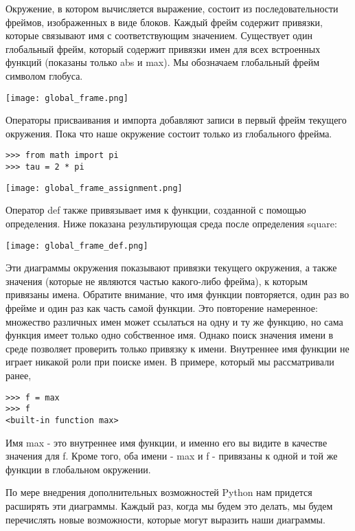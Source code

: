 Окружение, в котором вычисляется выражение, состоит из последовательности фреймов, изображенных в виде блоков. Каждый фрейм содержит привязки, которые связывают имя с соответствующим значением. Существует один глобальный фрейм, который содержит привязки имен для всех встроенных функций (показаны только abs и max). Мы обозначаем глобальный фрейм символом глобуса.
\begin{center}
  \texttt{[image: global\_frame.png]}
\end{center}

Операторы присваивания и импорта добавляют записи в первый фрейм текущего окружения. Пока что наше окружение состоит только из глобального фрейма.
\begin{verbatim}
>>> from math import pi
>>> tau = 2 * pi
\end{verbatim}

\begin{center}
  \texttt{[image: global\_frame\_assignment.png]}
\end{center}

Оператор def также привязывает имя к функции, созданной с помощью определения. Ниже показана результирующая среда после определения square:
\begin{center}
  \texttt{[image: global\_frame\_def.png]}
\end{center}

Эти диаграммы окружения показывают привязки текущего окружения, а также значения (которые не являются частью какого-либо фрейма), к которым привязаны имена. Обратите внимание, что имя функции повторяется, один раз во фрейме и один раз как часть самой функции. Это повторение намеренное: множество различных имен может ссылаться на одну и ту же функцию, но сама функция имеет только одно собственное имя. Однако поиск значения имени в среде позволяет проверить только привязку к имени. Внутреннее имя функции не играет никакой роли при поиске имен. В примере, который мы рассматривали ранее,
\begin{verbatim}
>>> f = max
>>> f
<built-in function max>
\end{verbatim}

Имя max - это внутреннее имя функции, и именно его вы видите в качестве значения для f. Кроме того, оба имени - max и f - привязаны к одной и той же функции в глобальном окружении.

По мере внедрения дополнительных возможностей Python нам придется расширять эти диаграммы. Каждый раз, когда мы будем это делать, мы будем перечислять новые возможности, которые могут выразить наши диаграммы.

